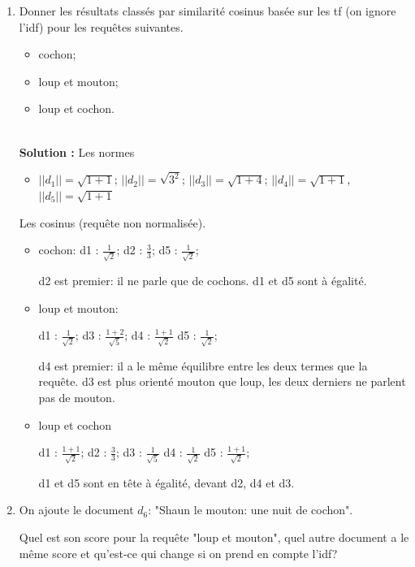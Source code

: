 \documentclass[11pt,a4paper]{article}
\newenvironment{solution}[0]{
~\\ \color{red} \textbf{Solution : }\color{black}}{%
}
\begin{document}
\begin{enumerate}
  \item Donner les résultats classés par similarité cosinus basée sur les tf 
  (on ignore l'idf) pour les requêtes suivantes.
  
  \begin{itemize}
    \item cochon;
    \item loup et mouton;
    \item loup et cochon.
  \end{itemize}
\begin{solution}
Les normes
\begin{itemize}
  \item $||d_1|| = \sqrt{1+ 1}$; $||d_2|| = \sqrt{3^2}$; $||d_3|| = \sqrt{1+4}$; 
    $||d_4|| = \sqrt{1+1}$, $||d_5|| = \sqrt{1+1}$  
\end{itemize}

Les cosinus (requête non normalisée).

\begin{itemize}
  \item cochon: d1 : $\frac{1}{\sqrt{2}}$;  
       d2 : $\frac{3}{3}$; 
       d5 : $\frac{1}{\sqrt{2}}$; 
       
       d2 est premier: il ne parle que de cochons. d1 et d5
       sont à égalité.
  
  \item loup et mouton: 
  
    d1 : $\frac{1}{\sqrt{2}}$; 
    d3 : $\frac{1+2}{\sqrt{5}}$;
    d4 :  $\frac{1+1}{\sqrt{2}}$  
    d5 : $\frac{1}{\sqrt{2}}$; 
    
    d4 est premier: il a le même équilibre entre les deux termes que la requête.
    d3 est plus orienté mouton que loup, les deux derniers ne parlent
    pas de mouton.
    
  \item loup et cochon
  
    d1 : $\frac{1+1}{\sqrt{2}}$; 
    d2 : $\frac{3}{3}$;
    d3 :  $\frac{1}{\sqrt{5}}$  
    d4 :  $\frac{1}{\sqrt{2}}$  
    d5 : $\frac{1+1}{\sqrt{2}}$; 
    
  d1 et d5 sont en tête à égalité, devant d2, d4 et d3.
 \end{itemize}

\end{solution}  

   \item On ajoute le document $d_6$: "Shaun le mouton: une nuit
   de cochon".
   
   Quel est son score pour la requête "loup et mouton", 
   quel autre document a le même score et qu'est-ce qui change
   si on prend en compte l'idf?
   

\end{enumerate}
\end{document}
